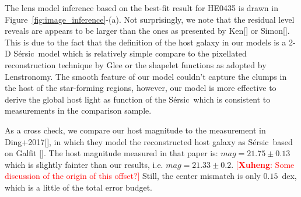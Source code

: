 \documentclass[fleqn,usenatbib]{mnras}
\newcommand{\sersic}{S\'ersic}
\newcommand{\lenstronomy}{{\sc Lenstronomy}}
\newcommand{\ding}[1]{\textcolor{red}{[{\bf Xuheng}: #1]}}
\begin{document}
The lens model inference based on the best-fit result for HE0435 is drawn in Figure~\ref{fig:image_inference}-(a). Not surprisingly, we note that the residual level reveals are appears to be larger than the ones as presented by Ken[] or Simon[]. This is due to the fact that the definition of the host galaxy in our models is a 2-D \sersic\ model which is relatively simple compare to the pixellated reconstruction technique by {\sc Glee} or the shapelet functions as adopted by \lenstronomy. The smooth feature of our model couldn't capture the clumps in the host of the star-forming regions, however, our model is more effective to derive the global host light as function of the \sersic\ which is consistent to measurements in the comparison sample. 

As a cross check, we compare our host magnitude to the measurement in Ding+2017[], in which they model the reconstructed host galaxy as \sersic\ based on Galfit []. The host magnitude measured in that paper is: $mag = 21.75 \pm 0.13$%
which is slightly fainter than our results, i.e. $mag = 21.33 \pm 0.2$. \ding{Some discussion of the origin of this offset?}
Still, the center mismatch is only $0.15$~dex, which is a little of the total error budget.
\end{document}
